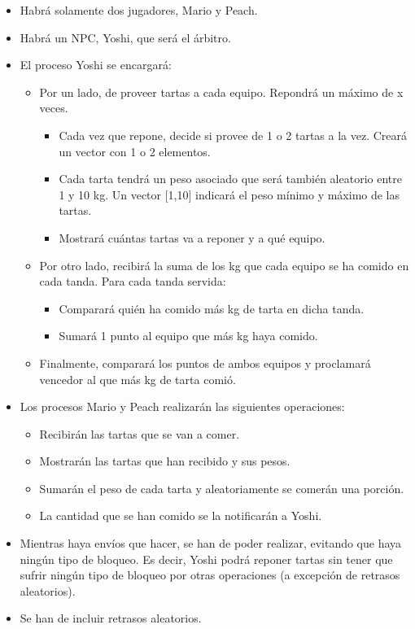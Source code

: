 \documentclass[a4paper,12pt]{article}
\begin{document}
\begin{itemize}
    \item Habrá solamente dos jugadores, Mario y Peach.
    \item Habrá un NPC, Yoshi, que será el árbitro.
    \item El proceso Yoshi se encargará:
    \begin{itemize}
        \item Por un lado, de proveer tartas a cada equipo. Repondrá un máximo de x veces.
        \begin{itemize}
            \item Cada vez que repone, decide si provee de 1 o 2 tartas a la vez. Creará un vector con 1 o 2 elementos.
            \item Cada tarta tendrá un peso asociado que será también aleatorio entre 1 y 10 kg. Un vector [1,10] indicará el peso mínimo y máximo de las tartas.
            \item Mostrará cuántas tartas va a reponer y a qué equipo.
        \end{itemize}
        \item Por otro lado, recibirá la suma de los kg que cada equipo se ha comido en cada tanda. Para cada tanda servida:
        \begin{itemize}
            \item Comparará quién ha comido más kg de tarta en dicha tanda.
            \item Sumará 1 punto al equipo que más kg haya comido.
        \end{itemize}
        \item Finalmente, comparará los puntos de ambos equipos y proclamará vencedor al que más kg de tarta comió.
    \end{itemize}
    \item Los procesos Mario y Peach realizarán las siguientes operaciones:
    \begin{itemize}
        \item Recibirán las tartas que se van a comer.
        \item Mostrarán las tartas que han recibido y sus pesos.
        \item Sumarán el peso de cada tarta y aleatoriamente se comerán una porción.
        \item La cantidad que se han comido se la notificarán a Yoshi.
    \end{itemize}
    \item Mientras haya envíos que hacer, se han de poder realizar, evitando que haya ningún tipo de bloqueo. Es decir, Yoshi podrá reponer tartas sin tener que sufrir ningún tipo de bloqueo por otras operaciones (a excepción de retrasos aleatorios).
    \item Se han de incluir retrasos aleatorios.
\end{itemize}
\end{document}
